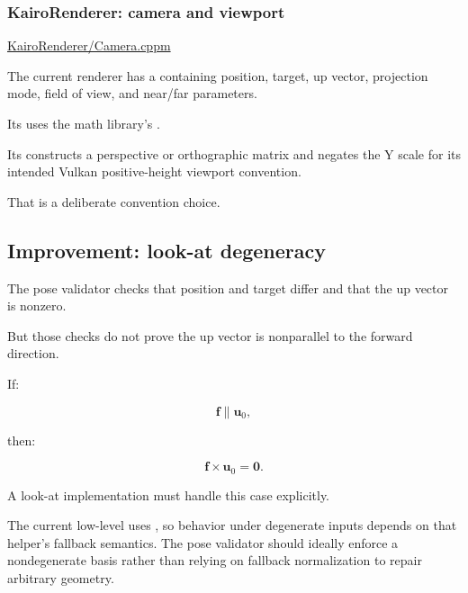 \subsubsection{KairoRenderer: camera and viewport}\label{02-foundations-ii-ch037-kairorenderer-camera-and-viewport}

\hypertarget{02-foundations-ii-ch037-kairorenderer-camera-and-viewport}{}

\href{https://github.com/swayam8624/KairoRenderer/blob/main/Camera.cppm?utm_source=chatgpt.com}{KairoRenderer/Camera.cppm}

The current renderer has a  containing position, target, up vector, projection mode, field of view, and near/far parameters.

Its  uses the math library's .

Its  constructs a perspective or orthographic matrix and negates the Y scale for its intended Vulkan positive-height viewport convention.

That is a deliberate convention choice.

\subsection{Improvement: look-at degeneracy}\label{02-foundations-ii-ch037-improvement-look-at-degeneracy}

\hypertarget{02-foundations-ii-ch037-improvement-look-at-degeneracy}{}

The pose validator checks that position and target differ and that the up vector is nonzero.

But those checks do not prove the up vector is nonparallel to the forward direction.

If:

\[
 \mathbf f\parallel\mathbf u_0,
\]

then:

\[
 \mathbf f\times\mathbf u_0=\mathbf0.
\]

A look-at implementation must handle this case explicitly.

The current low-level  uses , so behavior under degenerate inputs depends on that helper's fallback semantics. The pose validator should ideally enforce a nondegenerate basis rather than relying on fallback normalization to repair arbitrary geometry.

